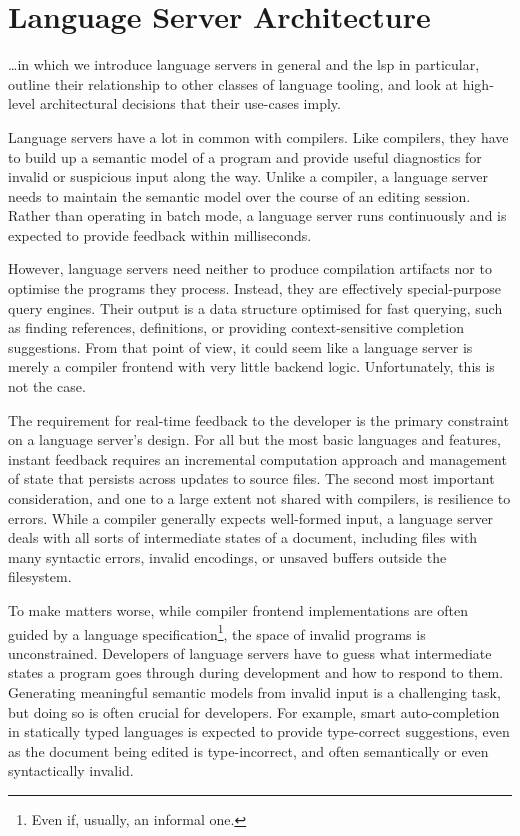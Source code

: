 \chapter{Language Server Architecture}

\begin{chapterabstract}
	\dots in which we introduce language servers in general and the
	\acrlong{lsp} in particular, outline their relationship to other classes of
	language tooling, and look at high-level architectural decisions that their
	use-cases imply.
\end{chapterabstract}

Language servers have a lot in common with compilers. Like compilers, they have
to build up a semantic model of a program and provide useful diagnostics for
invalid or suspicious input along the way. Unlike a compiler, a language server
needs to maintain the semantic model over the course of an editing session.
Rather than operating in batch mode, a language server runs continuously and is
expected to provide feedback within milliseconds.

However, language servers need neither to produce compilation artifacts nor to
optimise the programs they process. Instead, they are effectively
special-purpose query engines. Their output is a data structure optimised for
fast querying, such as finding references, definitions, or providing
context-sensitive completion suggestions. From that point of view, it could seem
like a language server is merely a compiler frontend with very little backend
logic. Unfortunately, this is not the case.

The requirement for real-time feedback to the developer is the primary
constraint on a language server's design. For all but the most basic languages
and features, instant feedback requires an incremental computation approach and
management of state that persists across updates to source files. The second
most important consideration, and one to a large extent not shared with
compilers, is resilience to errors. While a compiler generally expects
well-formed input, a language server deals with all sorts of intermediate states
of a document, including files with many syntactic errors, invalid encodings, or
unsaved buffers outside the filesystem.

To make matters worse, while compiler frontend implementations are often guided
by a language specification\footnote{Even if, usually, an informal one.}, the
space of invalid programs is unconstrained. Developers of language servers have
to guess what intermediate states a program goes through during development and
how to respond to them. Generating meaningful semantic models from invalid input
is a challenging task, but doing so is often crucial for developers. For
example, smart auto-completion in statically typed languages is expected to
provide type-correct suggestions, even as the document being edited is
type-incorrect, and often semantically or even syntactically invalid.

